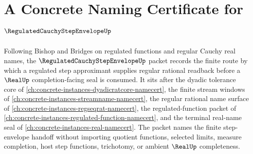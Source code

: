 \chapter{A Concrete Naming Certificate for $\RegulatedCauchyStepEnvelopeUp$}
\label{ch:concrete-instances-regulated-cauchy-step-envelope-namecert}

Following Bishop and Bridges on regulated functions and regular Cauchy real names, the $\RegulatedCauchyStepEnvelopeUp$ packet records the finite route by which a regulated step approximant supplies regular rational readback before a $\RealUp$ completion-facing seal is consumed. It sits after the dyadic tolerance core of \autoref{ch:concrete-instances-dyadicratcore-namecert}, the finite stream windows of \autoref{ch:concrete-instances-streamname-namecert}, the regular rational name surface of \autoref{ch:concrete-instances-regseqrat-namecert}, the regulated-function packet of \autoref{ch:concrete-instances-regulated-function-namecert}, and the terminal real-name seal of \autoref{ch:concrete-instances-real-namecert}. The packet names the finite step-envelope handoff without importing quotient functions, selected limits, measure completion, host step functions, trichotomy, or ambient $\RealUp$ completeness.

